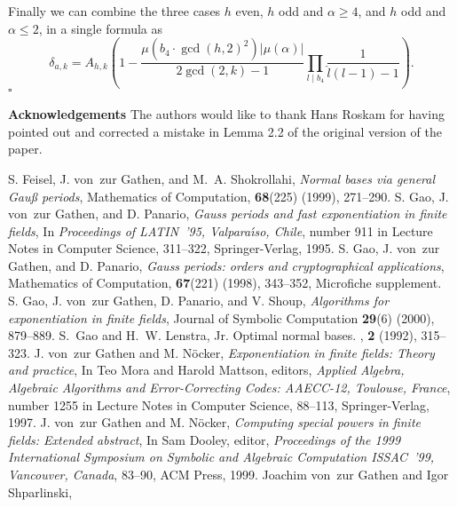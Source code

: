 \documentclass[twoside,final,reqno,noamsfonts]{birkartspecial}
\begin{document}
Finally we can combine the three cases $h$ even, $h$ odd and $\alpha \ge
4$, and $h$ odd and $\alpha \le 2$, in a single formula as
$$\delta_{a,k}=A_{h,k}\left(1-\frac{\mu(b_4\cdot\gcd(h,2)^2)|\mu(\alpha)|}
{2 \gcd (2,k)-1}\prod_{l\mid b_4}\frac{1}{\hat{l} (l-1)-1}\right).$$
\null\hfill$\square$\par\medbreak






\noindent\textbf{Acknowledgements} The authors would like to thank Hans Roskam for having pointed out
and corrected a mistake in Lemma 2.2 of the original version of the paper.

% 
% 
\begin{thebibliography}{99}
\itemsep=0.6pt%
{}
S. Feisel, J. von~zur Gathen, and M.~A. Shokrollahi,
\emph{Normal bases via general {Gau\ss} periods},
Mathematics of Computation, \textbf{68}(225) (1999), 271--290.
S. Gao, J. von~zur Gathen, and D. Panario,
\emph{Gauss periods and fast exponentiation in finite fields},
In {\em Proceedings of LATIN~'95, {\rm Valpara{\'{\i}}so, Chile}},
  number 911 in Lecture Notes in Computer Science, 311--322,
  Springer-Verlag, 1995.
S. Gao, J. von~zur Gathen, and D. Panario,
\emph{Gauss periods: orders and cryptographical applications},
{Mathematics of Computation}, \textbf{67}(221) (1998), 343--352,
Microfiche supplement.
S. Gao, J. von~zur Gathen, D. Panario, and V. Shoup,
\emph{Algorithms for exponentiation in finite fields},
{Journal of Symbolic Computation} \textbf{29}(6) (2000), 879--889.
S.~Gao and H.~W. Lenstra, Jr.
\newblock Optimal normal bases.
, \textbf{2} (1992), 315--323.
J. von~zur Gathen and M. N{\"o}cker,
\emph{Exponentiation in finite fields: Theory and practice},
In Teo Mora and Harold Mattson, editors, {\em Applied Algebra,
  Algebraic Algorithms and Error-Correcting Codes: AAECC-12, {\rm Toulouse,
  France}}, number 1255 in Lecture Notes in Computer Science, 88--113,
  Springer-Verlag, 1997.
J. von~zur Gathen and M. N{\"o}cker,
\emph{Computing special powers in finite fields: Extended abstract},
In Sam Dooley, editor, {\em Proceedings of the 1999 International
  Symposium on Symbolic and Algebraic Computation ISSAC~'99, {\rm Vancouver,
  Canada}},  83--90, ACM Press, 1999.
Joachim von~zur Gathen and Igor Shparlinski,

\end{thebibliography}
\end{document}
